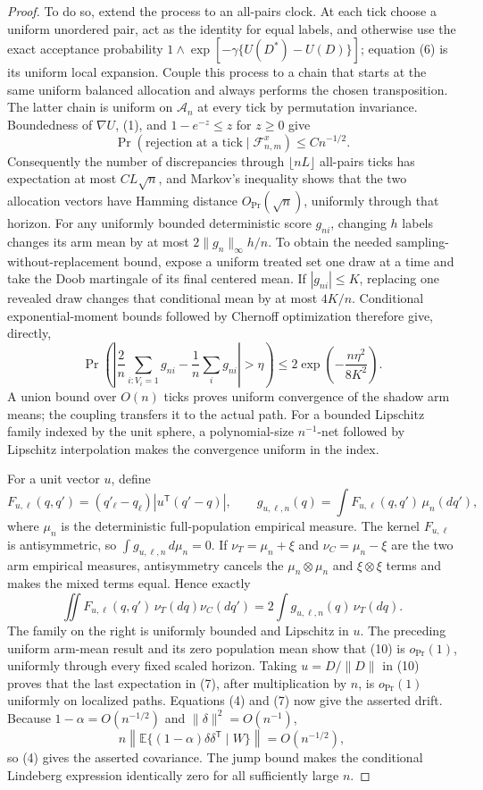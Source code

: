 \documentclass{article}
\begin{document}
\begin{proof}
To do so, extend the process to an all-pairs clock.  At each tick choose a uniform unordered pair, act as the identity for equal labels, and otherwise use the exact acceptance probability \(1\wedge\exp[-\gamma\{U(D^*)-U(D)\}]\); equation (6) is its uniform local expansion.  Couple this process to a chain that starts at the same uniform balanced allocation and always performs the chosen transposition.  The latter chain is uniform on \(\mathcal A_n\) at every tick by permutation invariance.  Boundedness of \(\nabla U\), (1), and \(1-e^{-z}\le z\) for \(z\ge0\) give
\[
 \Pr(\text{rejection at a tick}\mid\mathcal F^x_{n,m})\le Cn^{-1/2}. \tag{8}
\]
Consequently the number of discrepancies through \(\lfloor nL\rfloor\) all-pairs ticks has expectation at most \(CL\sqrt n\), and Markov's inequality shows that the two allocation vectors have Hamming distance \(O_{\Pr}(\sqrt n)\), uniformly through that horizon.  For any uniformly bounded deterministic score \(g_{ni}\), changing \(h\) labels changes its arm mean by at most \(2\|g_n\|_\infty h/n\).  To obtain the needed sampling-without-replacement bound, expose a uniform treated set one draw at a time and take the Doob martingale of its final centered mean.  If \(|g_{ni}|\le K\), replacing one revealed draw changes that conditional mean by at most \(4K/n\).  Conditional exponential-moment bounds followed by Chernoff optimization therefore give, directly,
\[
 \Pr\left(\left|\frac2n\sum_{i:V_i=1}g_{ni}-\frac1n\sum_i g_{ni}\right|>\eta\right)
 \le 2\exp\left(-\frac{n\eta^2}{8K^2}\right). \tag{9a}
\]
A union bound over \(O(n)\) ticks proves uniform convergence of the shadow arm means; the coupling transfers it to the actual path.  For a bounded Lipschitz family indexed by the unit sphere, a polynomial-size \(n^{-1}\)-net followed by Lipschitz interpolation makes the convergence uniform in the index.

For a unit vector \(u\), define
\[
 F_{u,\ell}(q,q')=(q'_{\ell}-q_{\ell})|u^{\mathsf T}(q'-q)|,
 \qquad g_{u,\ell,n}(q)=\int F_{u,\ell}(q,q')\,\mu_n(dq'), \tag{9}
\]
where \(\mu_n\) is the deterministic full-population empirical measure.  The kernel \(F_{u,\ell}\) is antisymmetric, so \(\int g_{u,\ell,n}\,d\mu_n=0\).  If \(\nu_T=\mu_n+\xi\) and \(\nu_C=\mu_n-\xi\) are the two arm empirical measures, antisymmetry cancels the \(\mu_n\otimes\mu_n\) and \(\xi\otimes\xi\) terms and makes the mixed terms equal.  Hence exactly
\[
 \iint F_{u,\ell}(q,q')\,\nu_T(dq)\nu_C(dq')
 =2\int g_{u,\ell,n}(q)\,\nu_T(dq). \tag{10}
\]
The family on the right is uniformly bounded and Lipschitz in \(u\).  The preceding uniform arm-mean result and its zero population mean show that (10) is \(o_{\Pr}(1)\), uniformly through every fixed scaled horizon.  Taking \(u=D/\|D\|\) in (10) proves that the last expectation in (7), after multiplication by \(n\), is \(o_{\Pr}(1)\) uniformly on localized paths.  Equations (4) and (7) now give the asserted drift.  Because \(1-\alpha=O(n^{-1/2})\) and \(\|\delta\|^2=O(n^{-1})\),
\[
 n\left\|\mathbb E\{(1-\alpha)\delta\delta^{\mathsf T}\mid W\}\right\|=O(n^{-1/2}), \tag{11}
\]
so (4) gives the asserted covariance.  The jump bound makes the conditional Lindeberg expression identically zero for all sufficiently large \(n\).


\end{proof}
\end{document}
